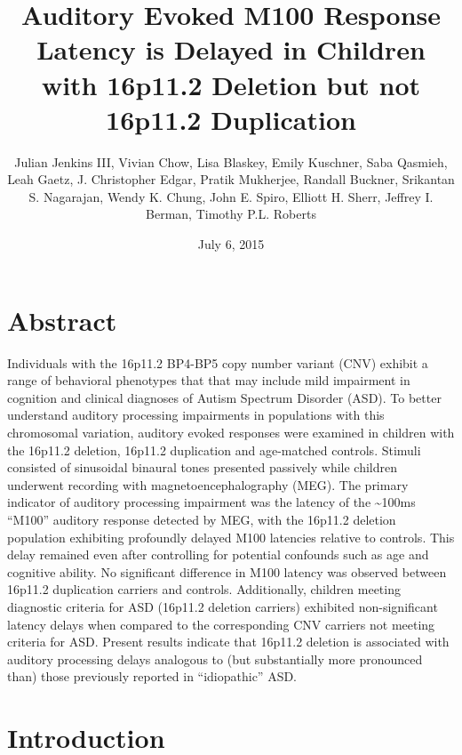 \documentclass[]{article}
\title{Auditory Evoked M100 Response Latency is Delayed in Children with
16p11.2 Deletion but not 16p11.2 Duplication}
\author{Julian Jenkins III, Vivian Chow, Lisa Blaskey, Emily Kuschner, Saba
Qasmieh, Leah Gaetz, J. Christopher Edgar, Pratik Mukherjee, Randall
Buckner, Srikantan S. Nagarajan, Wendy K. Chung, John E. Spiro, Elliott
H. Sherr, Jeffrey I. Berman, Timothy P.L. Roberts}
\date{July 6, 2015}
\begin{document}
\maketitle


{
\hypersetup{linkcolor=black}
\setcounter{tocdepth}{2}
\tableofcontents
}
\setlength{\textwidth}{6.5in} \setlength{\textheight}{9in}
\setlength{\oddsidemargin}{0in} \setlength{\evensidemargin}{0in}
\setlength{\topmargin}{-1in} \setlength\parindent{0pt}

\pagebreak

\section{Abstract}\label{abstract}

Individuals with the 16p11.2 BP4-BP5 copy number variant (CNV) exhibit a
range of behavioral phenotypes that that may include mild impairment in
cognition and clinical diagnoses of Autism Spectrum Disorder (ASD). To
better understand auditory processing impairments in populations with
this chromosomal variation, auditory evoked responses were examined in
children with the 16p11.2 deletion, 16p11.2 duplication and age-matched
controls. Stimuli consisted of sinusoidal binaural tones presented
passively while children underwent recording with magnetoencephalography
(MEG). The primary indicator of auditory processing impairment was the
latency of the \textasciitilde{}100ms ``M100'' auditory response
detected by MEG, with the 16p11.2 deletion population exhibiting
profoundly delayed M100 latencies relative to controls. This delay
remained even after controlling for potential confounds such as age and
cognitive ability. No significant difference in M100 latency was
observed between 16p11.2 duplication carriers and controls.
Additionally, children meeting diagnostic criteria for ASD (16p11.2
deletion carriers) exhibited non-significant latency delays when
compared to the corresponding CNV carriers not meeting criteria for ASD.
Present results indicate that 16p11.2 deletion is associated with
auditory processing delays analogous to (but substantially more
pronounced than) those previously reported in ``idiopathic'' ASD.

\pagebreak

\section{Introduction}\label{introduction}
\end{document}
